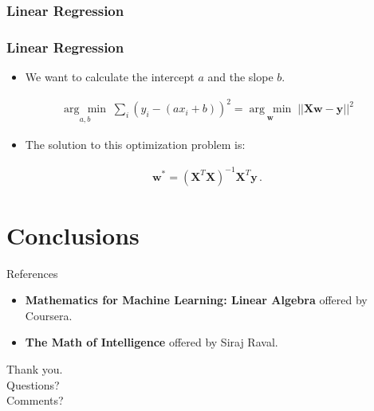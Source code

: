 \documentclass[handout]{beamer}
\newcommand{\argmin}[1]{\underset{#1}{\operatorname{arg}\,\operatorname{min}}\;}
\begin{document}
\begin{frame}[fragile]
    \frametitle{Linear Regression}
    \begin{figure}[htb]
        \centering
        
        \label{fig:regression}
	\end{figure}
\end{frame}

\begin{frame}[fragile]
    \frametitle{Linear Regression}
    \Large
    \begin{itemize}
        \item We want to calculate the intercept $a$ and the slope $b$.
    \end{itemize}
    \begin{align*}
        \argmin{a, b} \sum_i (y_i - (ax_i + b))^2 =
        \argmin{\boldsymbol{w}} || \boldsymbol{Xw} - \boldsymbol{y} ||^{2}
    \end{align*}
    \begin{itemize}
        \item The solution to this optimization problem is:
    \end{itemize}
    \begin{align*}
        \boldsymbol{w^{*}} = (\boldsymbol{X}^T\boldsymbol{X})^{-1}\boldsymbol{X}^{T}\boldsymbol{y}\,.
    \end{align*}
\end{frame}

%        
%
%		

\section{Conclusions}
\begin{frame}{References}
    \begin{itemize}
        \item \textbf{Mathematics for Machine Learning: Linear Algebra} offered by Coursera.
        \item \textbf{The Math of Intelligence} offered by Siraj Raval.
    \end{itemize}
\end{frame}

\begin{frame}
\huge{Thank you.}\\
\huge{Questions?}\\
\huge{Comments?}\\
\end{frame}
\end{document}
